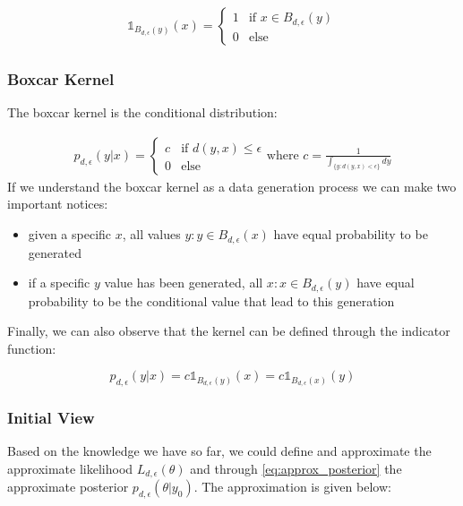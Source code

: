 \documentclass[11pt,twoside]{article}
\numberwithin{Theorem}{section}
\numberwithin{Definition}{section}
\numberwithin{Lemma}{section}
\numberwithin{Algorithm}{section}
\numberwithin{equation}{section}
\begin{document}
\begin{gather}
  \mathbb{1}_{B_{d,\epsilon}(y)}(x) = \left\{
	\begin{array}{ll}
		1 & \mbox{if } x \in B_{d,\epsilon}(y) \\
		0 & \mbox{else } 
	\end{array} \right. \end{gather}

\subsubsection*{Boxcar Kernel}

The boxcar kernel is the conditional distribution:

\begin{gather}
  p_{d,\epsilon}(y|x) = \left\{
	\begin{array}{ll}
		c  & \mbox{if } d(y,x) \leq \epsilon \\
		0 & \mbox{else } 
	\end{array}
  \right. \text{where } c = \frac{1}{\int_{ \{ y: d(y,x) < \epsilon\}} dy}
\end{gather}
%
If we understand the boxcar kernel as a data generation process we can make two important notices:

\begin{itemize}
\item given a specific $x$, all values $y: y \in B_{d,\epsilon}(x)$ have equal probability to be generated
  \item if a specific $y$ value has been generated, all $x: x \in B_{d,\epsilon}(y)$ have equal probability to be the conditional value that lead to this generation
  \end{itemize}
%
Finally, we can also observe that the kernel can be defined through the indicator function:

\begin{equation}
  p_{d,\epsilon}(y|x) = c \mathbb{1}_{B_{d,\epsilon}(y)}(x) = c \mathbb{1}_{B_{d,\epsilon}(x)}(y)
\end{equation}

\subsubsection*{Initial View}

Based on the knowledge we have so far, we could define and approximate the approximate likelihood $L_{d,\epsilon}(\theta)$ and through \ref{eq:approx_posterior} the approximate posterior $p_{d, \epsilon}(\theta|y_0)$. The approximation is given below:
\end{document}
